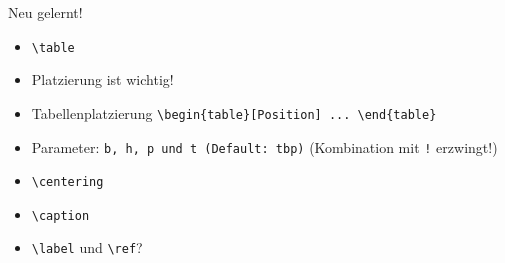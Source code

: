 \begin{frame}[fragile]{Neu gelernt!}
    \begin{itemize}[<+->]
        \item \lstinline|\table|
        \item Platzierung ist wichtig!
        \item Tabellenplatzierung \lstinline|\begin{table}[Position] ... \end{table}|
        \item Parameter: \lstinline|b, h, p und t (Default: tbp)| (Kombination mit \texttt{!} erzwingt!)
        \item \lstinline|\centering|
        \item \lstinline|\caption|
        \item \lstinline|\label| und \lstinline|\ref|? 
    \end{itemize}
\end{frame}